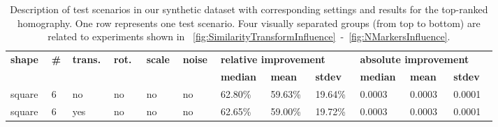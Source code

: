 \def\tblsccolw{0.06}
\def\tblrscolw{0.08}
\begin{table}[t]
    \caption[Description of synthetic dataset scenarios]{Description of test scenarios in our synthetic dataset with corresponding settings and results for the top-ranked homography. One row represents one test scenario. Four visually separated groups (from top to bottom) are related to experiments shown in \figtext{}~\ref{fig:SimilarityTransformInfluence}~-~\ref{fig:NMarkersInfluence}.}
    \label{tab:TestScenariosResults}
    \setlength{\tabcolsep}{3pt}
    \begin{center}
        \footnotesize
        \begin{tabular}{p{\tblsccolw\linewidth}p{0.03\linewidth}p{\tblsccolw\linewidth}p{\tblsccolw\linewidth}p{\tblsccolw\linewidth}p{\tblsccolw\linewidth}|p{\tblrscolw\linewidth}p{\tblrscolw\linewidth}p{\tblrscolw\linewidth}p{\tblrscolw\linewidth}p{\tblrscolw\linewidth}p{\tblrscolw\linewidth}}
            \toprule
            \multirow{2}{2pt}{\textbf{shape}}  &
            \multirow{2}{2pt}{\textbf{\#}}     &
            \multirow{2}{2pt}{\textbf{trans.}} &
            \multirow{2}{2pt}{\textbf{rot.}}   &
            \multirow{2}{2pt}{\textbf{scale}}  &
            \multirow{2}{2pt}{\textbf{noise}}  & \multicolumn{3}{l}{\textbf{relative improvement}} & \multicolumn{3}{l}{\textbf{absolute improvement}}                                                                                                      \\
                                               &                                                   &                                                   &     &     &     & \textbf{median} & \textbf{mean} & \textbf{stdev} &
            \textbf{median}                    & \textbf{mean}                                     & \textbf{stdev}                                                                                                                                         \\
            \midrule
            square                             & 6                                                 & no                                                & no  & no  & no  & 62.80\%         & 59.63\%       & 19.64\%        & 0.0003  & 0.0003   & 0.0001   \\
            square                             & 6                                                 & yes                                               & no  & no  & no  & 62.65\%         & 59.00\%       & 19.72\%        & 0.0003  & 0.0003   & 0.0001   \\

\end{tabular}
\end{center}
\end{table}
